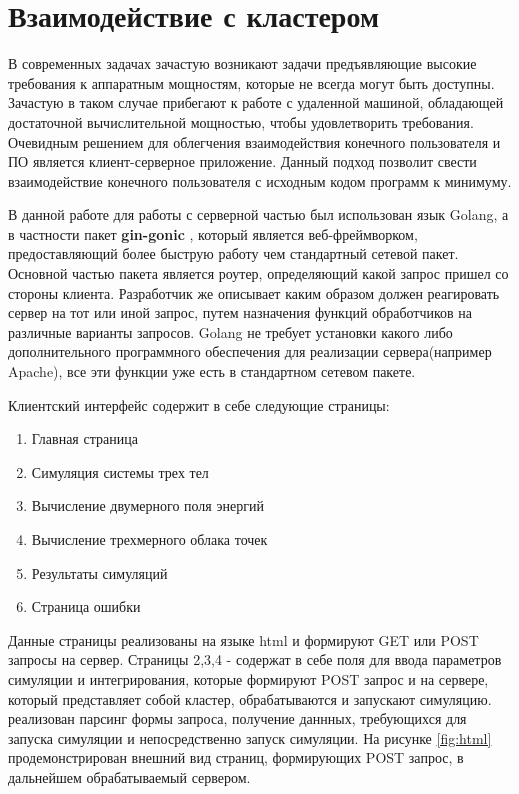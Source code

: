 \section{Взаимодействие с кластером}

В современных задачах зачастую возникают задачи предъявляющие высокие требования к аппаратным мощностям, которые не всегда
могут быть доступны. Зачастую в таком случае прибегают к работе с удаленной машиной, обладающей достаточной вычислительной мощностью,
чтобы удовлетворить требования. Очевидным решением для облегчения взаимодействия конечного пользователя и ПО является клиент-серверное
приложение. Данный подход позволит свести взаимодействие конечного пользователя с исходным кодом программ к минимуму.

В данной работе для работы с серверной частью был использован язык Golang, а в частности пакет \textbf{gin-gonic} \cite{GinGonic}, который является веб-фреймворком,
предоставляющий более быструю работу чем стандартный сетевой пакет. Основной частью пакета является роутер, определяющий
какой запрос пришел со стороны клиента. Разработчик же описывает каким образом должен реагировать сервер на тот или иной запрос, 
путем назначения функций обработчиков на различные варианты запросов. Golang не требует установки какого либо дополнительного программного обеспечения 
для реализации сервера(например Apache), все эти функции уже есть в стандартном сетевом пакете.

Клиентский интерфейс содержит в себе следующие страницы:
\begin{enumerate}
    \item Главная страница
    \item Симуляция системы трех тел
    \item Вычисление двумерного поля энергий
    \item Вычисление трехмерного облака точек
    \item Результаты симуляций
    \item Страница ошибки
\end{enumerate}

Данные страницы реализованы на языке html и формируют GET или POST запросы на сервер. Страницы 2,3,4 -  содержат в себе поля для ввода параметров симуляции 
и интегрирования, которые формируют POST запрос и на сервере, который представляет собой кластер, обрабатываются и запускают симуляцию. 
реализован парсинг формы запроса, получение даннных, требующихся для запуска симуляции и непосредственно запуск симуляции. На рисунке \ref{fig:html} 
продемонстрирован внешний вид страниц, формирующих POST запрос, в дальнейшем обрабатываемый сервером.



